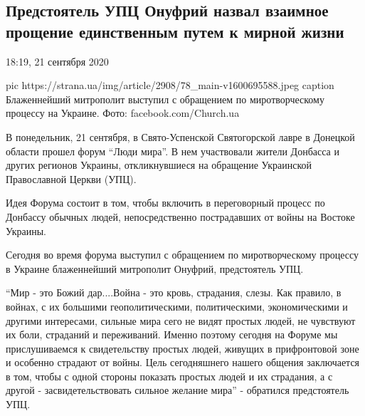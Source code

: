  
 
 
 
 
 
\subsection{Предстоятель УПЦ Онуфрий назвал взаимное прощение единственным путем к мирной жизни}
\label{sec:21_09_2020.news.ua.strana.1.onufrii_mir_upc}

18:19, 21 сентября 2020

\ifcmt
pic https://strana.ua/img/article/2908/78_main-v1600695588.jpeg
caption Блаженнейший митрополит выступил с обращением по миротворческому процессу на Украине. Фото: facebook.com/Church.ua
\fi

В понедельник, 21 сентября, в Свято-Успенской Святогорской лавре в
Донецкой области прошел форум \enquote{Люди мира}. В нем участвовали жители
Донбасса и других регионов Украины, откликнувшиеся на обращение Украинской
Православной Церкви (УПЦ).

Идея Форума состоит в том, чтобы включить в переговорный процесс по Донбассу
обычных людей, непосредственно пострадавших от войны на Востоке Украины.

Сегодня во время форума выступил с обращением по миротворческому процессу
в Украине блаженнейший митрополит Онуфрий, предстоятель УПЦ.

\enquote{Мир - это Божий дар....Война - это кровь, страдания, слезы. Как правило,
в войнах, с их большими геополитическими, политическими, экономическими и
другими интересами, сильные мира сего не видят простых людей, не чувствуют
их боли, страданий и переживаний. Именно поэтому сегодня на Форуме мы
прислушиваемся к свидетельству простых людей, живущих в прифронтовой зоне
и особенно страдают от войны. Цель сегодняшнего нашего общения заключается
в том, чтобы с одной стороны показать простых людей и их страдания, а с
другой - засвидетельствовать сильное желание мира} - обратился
предстоятель УПЦ.


